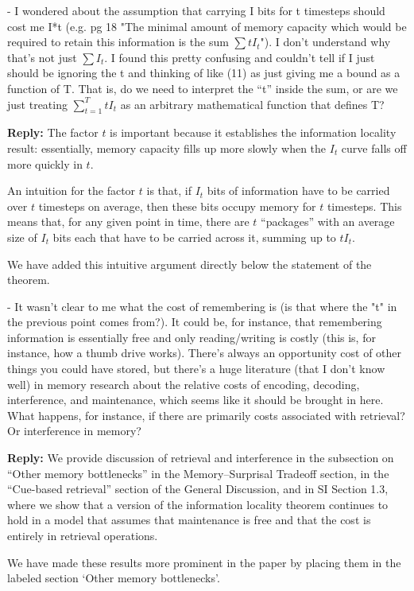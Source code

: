 \documentclass{article}[11pt,a4paper,oneside]
\newenvironment{reply}
  {\par\medskip
   \color{blue}%
   \begin{framed}
   \textbf{Reply: }\ignorespaces}
 {\end{framed}
  \medskip}
\begin{document}
- I wondered about the assumption that carrying I bits for t timesteps should cost me I*t (e.g. pg 18 "The minimal amount of memory capacity which would be required to retain this information is the sum $\sum t I_t$"). I don't understand why that's not just $\sum I_t$. I found this pretty confusing and couldn't tell if I just should be ignoring the t and thinking of like (11) as just giving me a bound as a function of T. That is, do we need to interpret the ``t'' inside the sum, or are we just treating $\sum_{t=1}^T t I_t$ as an arbitrary mathematical function that defines T?

\begin{reply}
The factor $t$ is important because it establishes the information locality result: essentially, memory capacity fills up more slowly when the $I_t$ curve falls off more quickly in $t$.

An intuition for the factor $t$ is that, if $I_t$ bits of information have to be carried over $t$ timesteps on average, then these bits occupy memory for $t$ timesteps.
This means that, for any given point in time, there are $t$ ``packages'' with an average size of $I_t$ bits each that have to be carried across it, summing up to $t I_t$.

We have added this intuitive argument directly below the statement of the theorem.
\end{reply}

- It wasn't clear to me what the cost of remembering is (is that where the "t" in the previous point comes from?). It could be, for instance, that remembering information is essentially free and only reading/writing is costly (this is, for instance, how a thumb drive works). There's always an opportunity cost of other things you could have stored, but there's a huge literature (that I don't know well) in memory research about the relative costs of encoding, decoding, interference, and maintenance, which seems like it should be brought in here. What happens, for instance, if there are primarily costs associated with retrieval? Or interference in memory?

\begin{reply}
We provide discussion of retrieval and interference in the subsection on ``Other memory bottlenecks'' in the Memory--Surprisal Tradeoff section, in the ``Cue-based retrieval'' section of the General Discussion, and in SI Section 1.3, where we show that a version of the information locality theorem continues to hold in a model that assumes that maintenance is free and that the cost is entirely in retrieval operations.

We have made these results more prominent in the paper by placing them in the labeled section `Other memory bottlenecks'.
\end{reply}
\end{document}
